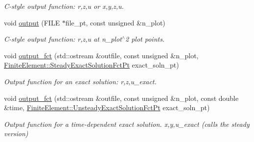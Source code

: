 \begin{DoxyCompactItemize}
\begin{DoxyCompactList}\small\item\em C-\/style output function\+: r,z,u or x,y,z,u. \end{DoxyCompactList}\item 
void \hyperlink{classoomph_1_1TFourierDecomposedHelmholtzElement_a6d354eaf73ecef7a77db246e728a7ed1}{output} (F\+I\+LE $\ast$file\+\_\+pt, const unsigned \&n\+\_\+plot)
\begin{DoxyCompactList}\small\item\em C-\/style output function\+: r,z,u at n\+\_\+plot$^\wedge$2 plot points. \end{DoxyCompactList}\item 
void \hyperlink{classoomph_1_1TFourierDecomposedHelmholtzElement_ac9683f67f96bc22aa36ac4009c97ffdd}{output\+\_\+fct} (std\+::ostream \&outfile, const unsigned \&n\+\_\+plot, \hyperlink{classoomph_1_1FiniteElement_a690fd33af26cc3e84f39bba6d5a85202}{Finite\+Element\+::\+Steady\+Exact\+Solution\+Fct\+Pt} exact\+\_\+soln\+\_\+pt)
\begin{DoxyCompactList}\small\item\em Output function for an exact solution\+: r,z,u\+\_\+exact. \end{DoxyCompactList}\item 
void \hyperlink{classoomph_1_1TFourierDecomposedHelmholtzElement_a0d7669c1d9028c760c2c77b0be927f97}{output\+\_\+fct} (std\+::ostream \&outfile, const unsigned \&n\+\_\+plot, const double \&time, \hyperlink{classoomph_1_1FiniteElement_ad4ecf2b61b158a4b4d351a60d23c633e}{Finite\+Element\+::\+Unsteady\+Exact\+Solution\+Fct\+Pt} exact\+\_\+soln\+\_\+pt)
\begin{DoxyCompactList}\small\item\em Output function for a time-\/dependent exact solution. x,y,u\+\_\+exact (calls the steady version) \end{DoxyCompactList}\end{DoxyCompactItemize}
